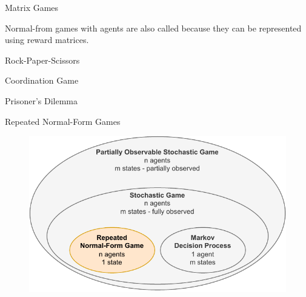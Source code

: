 \begin{frame}{Matrix Games}

     Normal-from games with  agents are also called  because they can be represented using reward matrices.

    \vspace{10pt} 
    
        \centering
        \begin{minipage}[b]{0.32\textwidth}
            \centering
            \gamerps
            
            \vspace{5pt}
            Rock-Paper-Scissors
        \end{minipage}\hfill
        \begin{minipage}[b]{0.32\textwidth}
            \centering
            \gamecoord
            
            \vspace{5pt}
            Coordination Game
        \end{minipage}\hfill
        \begin{minipage}[b]{0.32\textwidth}
            \centering
            \gamepd
            
            \vspace{5pt}
            Prisoner's Dilemma
        \end{minipage}

\end{frame}

\begin{frame}{Repeated Normal-Form Games}

\begin{figure}
    \centering
    \includegraphics{images/chapter_3/normal_form_hierarchy.pdf}
\end{figure}
    
\end{frame}


